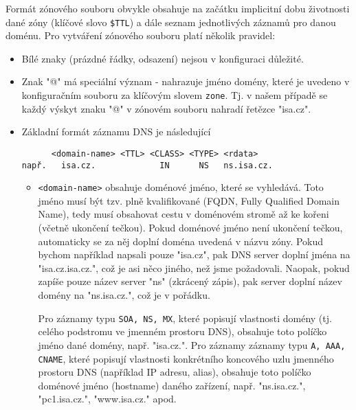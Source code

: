 Formát zónového souboru obvykle obsahuje na začátku implicitní dobu životnosti dané zóny (klíčové slovo {\tt \$TTL}) a dále seznam jednotlivých záznamů pro danou doménu. Pro vytváření zónového souboru platí několik pravidel:
\begin{itemize}
  \item Bílé znaky (prázdné řádky, odsazení) nejsou v konfiguraci důležité.
  \item Znak "@" má speciální význam - nahrazuje jméno domény, které je uvedeno v konfiguračním souboru za klíčovým slovem {\tt zone}. Tj. v našem případě se každý výskyt znaku "@" v zónovém souboru nahradí řetězce "isa.cz".
  \item Základní formát záznamu DNS je následující
\begin{verbatim}
      <domain-name> <TTL> <CLASS> <TYPE> <rdata>
např.   isa.cz.             IN      NS   ns.isa.cz.
\end{verbatim}
  \begin{itemize}
    \item \verb|<domain-name>| obsahuje doménové jméno, které se vyhledává. Toto jméno musí být tzv. plně kvalifikované (FQDN, Fully Qualified Domain Name), tedy musí obsahovat cestu v doménovém stromě až ke kořeni (včetně ukončení tečkou). Pokud doménové jméno není ukončení tečkou, automaticky se za něj doplní doména uvedená v názvu zóny. Pokud bychom například napsali pouze "isa.cz", pak DNS server doplní jména na "isa.cz.isa.cz.", což je asi něco jiného, než jsme požadovali. Naopak, pokud zapíše pouze název server "ns" (zkrácený zápis), pak server doplní název domény na "ns.isa.cz.", což je v pořádku.
    
    Pro záznamy typu {\tt SOA, NS, MX}, které popisují vlastnosti domény (tj. celého podstromu ve jmenném prostoru DNS), obsahuje toto políčko jméno dané domény, např. "isa.cz.". Pro záznamy záznamy typu {\tt A, AAA, CNAME}, které popisují vlastnosti konkrétního koncového uzlu jmenného prostoru DNS (například IP adresu, alias), obsahuje toto políčko doménové jméno (hostname) daného zařízení, např. "ns.isa.cz.", "pc1.isa.cz.", "www.isa.cz." apod. 
    

\end{itemize}
\end{itemize}
